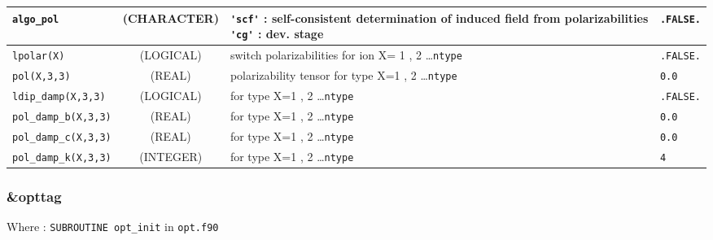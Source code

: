 \documentclass[a4paper]{article}
\begin{document}
\begin{longtable}{l|c|m{8cm}|m{2cm}}
\hline
\rule[-0.75cm]{0cm}{1.5cm}
\verb?algo_pol?  & (CHARACTER)        & \verb?'scf'? : self-consistent determination of induced field from polarizabilities
                                        \verb?'cg'? :  dev. stage                                                           & \verb?.FALSE.?\\
\hline
\rule[-0.75cm]{0cm}{1.5cm}
\verb?lpolar(X)? & (LOGICAL)          & switch polarizabilities for ion X= 1 , 2 \ldots \verb?ntype?                        & \verb?.FALSE.?\\
\hline
\rule[-0.75cm]{0cm}{1.5cm}
\verb?pol(X,3,3)?& (REAL)             & polarizability tensor for type X=1 , 2 \ldots \verb?ntype?                        & \verb?0.0? \\
\hline
\rule[-0.75cm]{0cm}{1.5cm}
\verb?ldip_damp(X,3,3)?      
                 & (LOGICAL)          & for type X=1 , 2 \ldots \verb?ntype?                        & \verb?.FALSE.? \\
\hline
\rule[-0.75cm]{0cm}{1.5cm}
\verb?pol_damp_b(X,3,3)?     
                 & (REAL)             & for type X=1 , 2 \ldots \verb?ntype?                        & \verb?0.0? \\
\hline
\rule[-0.75cm]{0cm}{1.5cm}
\verb?pol_damp_c(X,3,3)?     
                 & (REAL)             & for type X=1 , 2 \ldots \verb?ntype?                        & \verb?0.0? \\
\hline
\rule[-0.75cm]{0cm}{1.5cm}
\verb?pol_damp_k(X,3,3)?     
                 & (INTEGER)          & for type X=1 , 2 \ldots \verb?ntype?                        & \verb?4? \\
\hline
\hline
\end{longtable}

\subsubsection{\&opttag}

Where : \verb?SUBROUTINE opt_init? in \verb?opt.f90?
\newline
\end{document}
